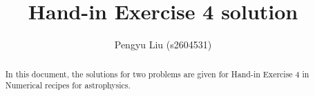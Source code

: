 \documentclass[a4paper,10pt]{article}
\title{Hand-in Exercise 4 solution}
\author{Pengyu Liu (s2604531)}
\begin{document}
\maketitle

\begin{abstract}
In this document, the solutions for two problems are given for Hand-in Exercise 4 in Numerical recipes for astrophysics.

\end{abstract}




\end{document}
